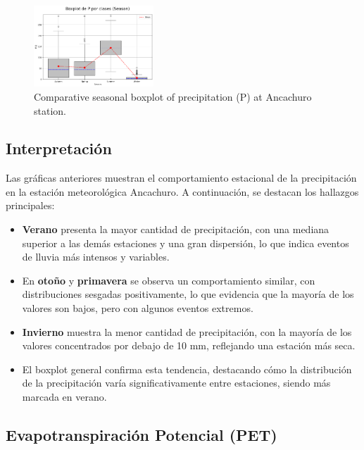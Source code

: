 \vspace{0.2cm}

\begin{figure}[H]
\centering
\includegraphics[width=0.4\textwidth]{resultados/por_estacion_del_anio/boxplot_clases_por_estacion/Ancachuro/P_ClassBoxplot_Season.png}
\caption{Comparative seasonal boxplot of precipitation (P) at Ancachuro station.}
\label{fig:ancachuro_p_box}
\end{figure}

\subsection*{Interpretación}

Las gráficas anteriores muestran el comportamiento estacional de la precipitación en la estación meteorológica Ancachuro. A continuación, se destacan los hallazgos principales:

\begin{itemize}
    \item \textbf{Verano} presenta la mayor cantidad de precipitación, con una mediana superior a las demás estaciones y una gran dispersión, lo que indica eventos de lluvia más intensos y variables.
    \item En \textbf{otoño} y \textbf{primavera} se observa un comportamiento similar, con distribuciones sesgadas positivamente, lo que evidencia que la mayoría de los valores son bajos, pero con algunos eventos extremos.
    \item \textbf{Invierno} muestra la menor cantidad de precipitación, con la mayoría de los valores concentrados por debajo de 10 mm, reflejando una estación más seca.
    \item El boxplot general confirma esta tendencia, destacando cómo la distribución de la precipitación varía significativamente entre estaciones, siendo más marcada en verano.
\end{itemize}



\subsection{Evapotranspiración Potencial (PET)}

